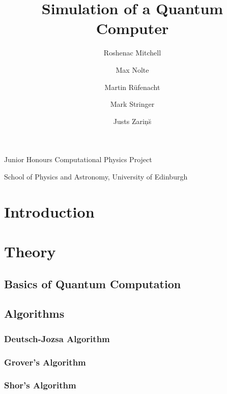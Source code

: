 \documentclass{article}
\title{\Huge Simulation of a Quantum Computer}
\author{Roshenac Mitchell \and Max Nolte \and Martin R\"{u}fenacht \and Mark Stringer \and Justs Zari\c{n}\u{s} }
\begin{document}
\maketitle

\vfill

\begin{onehalfspace}

\begin{abstract}

\end{abstract}

\vspace{50mm}

\begin{center}
Junior Honours Computational Physics Project

School of Physics and Astronomy, University of Edinburgh
\end{center}

\thispagestyle{empty}

\clearpage

\tableofcontents
\thispagestyle{empty}

\clearpage

\setcounter{page}{1}

\section{Introduction}


\section{Theory}
\subsection{Basics of Quantum Computation}


\subsection{Algorithms}
\subsubsection{Deutsch-Jozsa Algorithm}

\subsubsection{Grover's Algorithm}

\subsubsection{Shor's Algorithm}



\end{onehalfspace}
\end{document}
